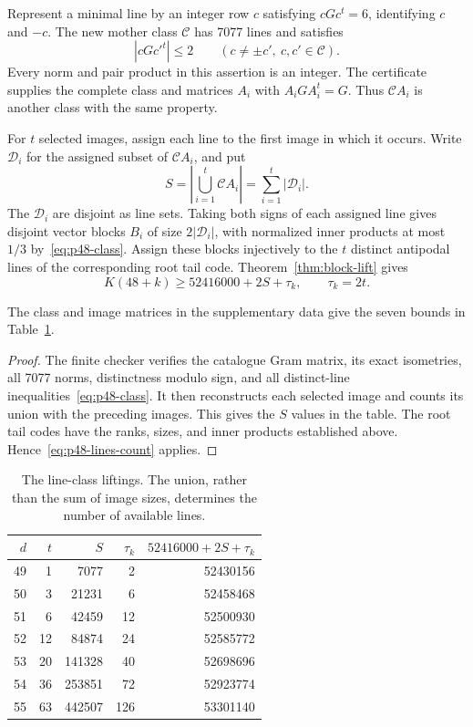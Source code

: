 Represent a minimal line by an integer row $c$ satisfying
$cGc^t=6$, identifying $c$ and $-c$. The new mother class
$\mathcal C$ has 7077 lines and satisfies
\begin{equation}\label{eq:p48-class}
 |cGc'^t|\le2\qquad(c\ne\pm c',\ c,c'\in\mathcal C).
\end{equation}
Every norm and pair product in this assertion is an integer.
The certificate supplies the complete class and matrices $A_i$ with
$A_iGA_i^t=G$. Thus $\mathcal C A_i$ is another class with the
same property.

For $t$ selected images, assign each line to the first image in which
it occurs. Write $\mathcal D_i$ for the assigned subset of
$\mathcal C A_i$, and put
\[
 S=\left|\bigcup_{i=1}^t\mathcal C A_i\right|
   =\sum_{i=1}^t|\mathcal D_i|.
\]
The $\mathcal D_i$ are disjoint as line sets. Taking both signs of
each assigned line gives disjoint vector blocks $B_i$ of size
$2|\mathcal D_i|$, with normalized inner products at most $1/3$
by~\eqref{eq:p48-class}. Assign these blocks injectively to the $t$
distinct antipodal lines of the corresponding root tail code.
Theorem~\ref{thm:block-lift} gives
\begin{equation}\label{eq:p48-lines-count}
 K(48+k)\ge52416000+2S+\tau_k,
 \qquad \tau_k=2t.
\end{equation}

\begin{theorem}\label{thm:p48-update}
The class and image matrices in the supplementary data give the
seven bounds in Table~\ref{tab:p48-update}.
\end{theorem}
\begin{proof}
The finite checker verifies the catalogue Gram matrix, its exact
isometries, all 7077 norms, distinctness modulo sign, and
all distinct-line inequalities~\eqref{eq:p48-class}. It then
reconstructs each selected image and counts its union with the
preceding images. This gives the $S$ values in the table.
The root tail codes have the ranks, sizes, and inner products
established above. Hence~\eqref{eq:p48-lines-count} applies.
\end{proof}

\begin{table}[ht]
\centering
\caption{The line-class liftings. The union, rather than
the sum of image sizes, determines the number of available lines.}
\label{tab:p48-update}
\begin{tabular}{rrrrr}
\toprule
$d$&$t$&$S$&$\tau_k$&$52416000+2S+\tau_k$\\\midrule
49&1&7077&2&52430156\\
50&3&21231&6&52458468\\
51&6&42459&12&52500930\\
52&12&84874&24&52585772\\
53&20&141328&40&52698696\\
54&36&253851&72&52923774\\
55&63&442507&126&53301140\\\bottomrule
\end{tabular}
\end{table}

